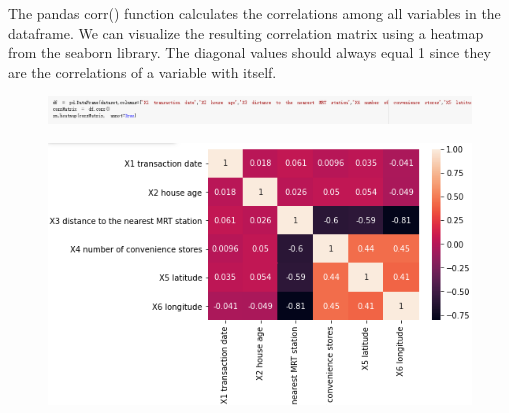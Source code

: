 \documentclass{article}
\begin{document}
The pandas corr() function calculates the correlations among all variables in the dataframe. We can visualize the resulting correlation matrix using a heatmap from the seaborn library. The diagonal values should always equal 1 since they are the correlations of a variable with itself.
\begin{figure}[H]\includegraphics[width=1.1\linewidth]{8}\end{figure}
\begin{figure}[H]\includegraphics[width=0.9\linewidth]{9}\end{figure}
\end{document}

